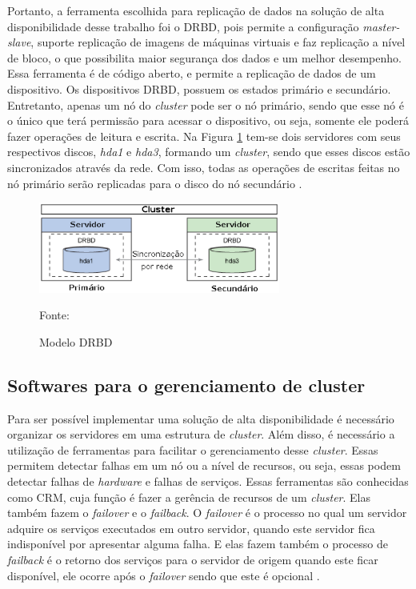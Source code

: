 Portanto, a ferramenta escolhida para replicação de dados na solução de alta disponibilidade desse trabalho foi o \ac{DRBD}, pois permite a 
configuração \textit{master-slave}, suporte replicação de imagens de máquinas virtuais e faz replicação a nível de bloco, o que possibilita maior 
segurança dos dados e um melhor desempenho.
Essa ferramenta é de código aberto, e permite a replicação de dados de um dispositivo. Os dispositivos \ac{DRBD}, possuem os estados primário 
e secundário. Entretanto, apenas um nó do \textit{cluster} pode ser o nó primário, sendo que esse nó é o único que terá permissão para acessar 
o dispositivo, ou seja, somente ele poderá fazer operações de leitura e escrita. Na Figura \ref{fig:drbd_basic} tem-se dois servidores com seus 
respectivos discos, \textit{hda1} e \textit{hda3}, formando um \textit{cluster}, sendo que esses discos estão sincronizados através da rede. 
Com isso, todas as operações de escritas feitas no nó primário serão replicadas para o disco do nó secundário \cite{zaminhani2008}.

\begin{figure}[h!]
 \centering
 \includegraphics[width=300px]{img/drbd_basic.eps}
 \caption{Modelo DRBD}
 Fonte: \citet{jones2010}
 \label{fig:drbd_basic}
\end{figure}

\subsection{Softwares para o gerenciamento de cluster}
\label{section:toolcluster}

Para ser possível implementar uma solução de alta disponibilidade é necessário organizar os servidores em uma estrutura de \textit{cluster}.
Além disso, é necessário a utilização de ferramentas para facilitar o gerenciamento desse \textit{cluster}. Essas permitem detectar falhas em um 
nó ou a nível de recursos, ou seja, essas podem detectar falhas de \textit{hardware} e falhas de serviços. Essas ferramentas são conhecidas 
como \ac{CRM}, cuja função é fazer a gerência de recursos de um \textit{cluster}. Elas também fazem o \textit{failover} e o \textit{failback}.
O \textit{failover} é o processo no qual um servidor adquire os serviços executados em outro servidor, quando este servidor fica indisponível
por apresentar alguma falha. E elas fazem também o processo de \textit{failback} é o retorno dos serviços para o servidor de origem quando este 
ficar disponível, ele ocorre após o \textit{failover} sendo que este é opcional \cite{bassan2008}.

